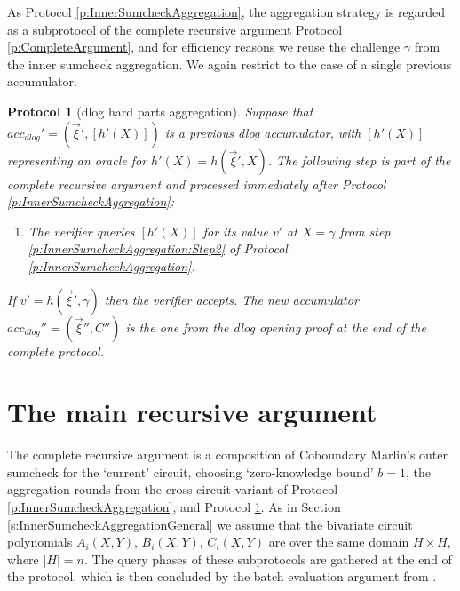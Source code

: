 \documentclass[10pt,article,oneside]{memoir}
\newtheorem{protocol}[]{Protocol}
\theoremstyle{definition}
\theoremstyle{remark}
\begin{document}
As Protocol \ref{p:InnerSumcheckAggregation}, the aggregation strategy is regarded as a subprotocol of the complete recursive argument Protocol \ref{p:CompleteArgument}, and for efficiency reasons we reuse the challenge $\gamma$ from the inner sumcheck aggregation.
We again restrict to the case of a single previous accumulator.

\begin{protocol}[dlog hard parts aggregation]
\label{p:IPAAggregation}
Suppose that $acc_{dlog}'=(\vec\xi',[h'(X)])$ is a previous dlog accumulator, with $[h'(X)]$ representing an oracle for $h'(X)=h(\vec\xi',X)$.
The following step is part of the complete recursive argument and processed immediately after Protocol \ref{p:InnerSumcheckAggregation}:
\begin{enumerate}
\item
\label{p:InnerSumcheckAggregationStep1}
The verifier queries $[h'(X)]$ for its value $v'$ at  $X=\gamma$ from step \eqref{p:InnerSumcheckAggregation:Step2} of Protocol \ref{p:InnerSumcheckAggregation}. 
\end{enumerate}
If $v'=h(\vec\xi', \gamma)$ then the verifier accepts.
The new accumulator $acc_{dlog}''=(\vec\xi'',C'')$ is the one from the dlog opening proof at the end of the complete protocol.
\end{protocol}



\section{The main recursive argument}
\label{s:FullProtocol}

The complete recursive argument is a composition of Coboundary Marlin's outer sumcheck for the `current' circuit, choosing `zero-knowledge bound' $b=1$, the aggregation rounds from the cross-circuit variant of Protocol \ref{p:InnerSumcheckAggregation}, and Protocol \ref{p:IPAAggregation}.
As in Section \ref{s:InnerSumcheckAggregationGeneral} we assume that the bivariate circuit polynomials $A_i(X,Y)$, $B_i(X,Y)$, $C_i(X,Y)$ are over the same domain $H\times H$, where $|H|=n$.
The query phases of these subprotocols are gathered at the end of the protocol, which is then concluded by the batch evaluation argument from \cite{HaloInfinite}.
\end{document}
